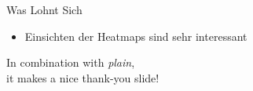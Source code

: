 \documentclass[compress,12pt]{beamer}
\begin{document}
    \begin{frame}{Was Lohnt Sich}
        \begin{itemize}
            \item Einsichten der Heatmaps sind sehr interessant
        \end{itemize}
    \end{frame}
    \End

    \begin{frame}
        \centering
        In combination with \textit{plain}, \\
        it makes a nice thank-you slide!
    \end{frame}
\end{document}
